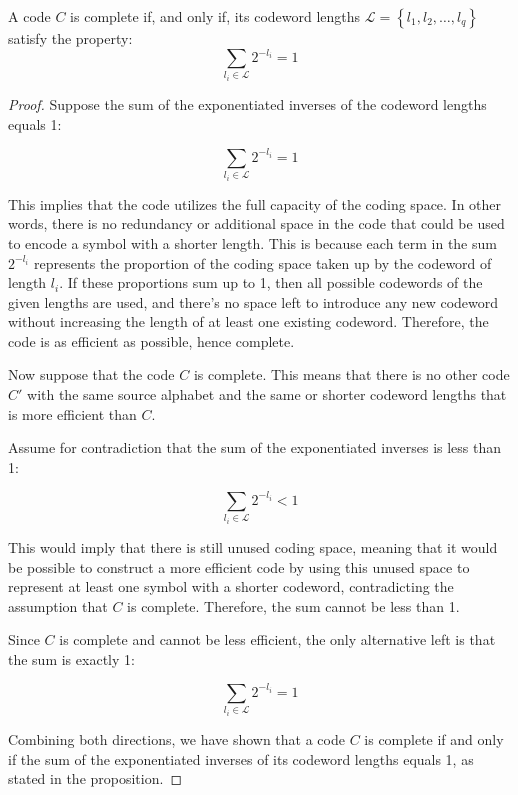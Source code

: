 \begin{proposition}
A code $C$ is complete if, and only if, its codeword lengths $\mathcal{L}=\left\{ l_{1},l_{2},\ldots,l_{q}\right\}$ satisfy the property:
\[
\sum_{l_{i}\in\mathcal{L}}2^{-l_{i}} = 1
\]
\end{proposition}
\begin{proof}
Suppose the sum of the exponentiated inverses of the codeword lengths equals 1:

\[
\sum_{l_{i}\in\mathcal{L}}2^{-l_{i}} = 1
\]

This implies that the code utilizes the full capacity of the coding space. In other words, there is no redundancy or additional space in the code that could be used to encode a symbol with a shorter length. This is because each term in the sum \( 2^{-l_{i}} \) represents the proportion of the coding space taken up by the codeword of length \( l_{i} \). If these proportions sum up to 1, then all possible codewords of the given lengths are used, and there's no space left to introduce any new codeword without increasing the length of at least one existing codeword. Therefore, the code is as efficient as possible, hence complete.

Now suppose that the code \( C \) is complete. This means that there is no other code \( C' \) with the same source alphabet and the same or shorter codeword lengths that is more efficient than \( C \).

Assume for contradiction that the sum of the exponentiated inverses is less than 1:

\[
\sum_{l_{i}\in\mathcal{L}}2^{-l_{i}} < 1
\]

This would imply that there is still unused coding space, meaning that it would be possible to construct a more efficient code by using this unused space to represent at least one symbol with a shorter codeword, contradicting the assumption that \( C \) is complete. Therefore, the sum cannot be less than 1.

Since \( C \) is complete and cannot be less efficient, the only alternative left is that the sum is exactly 1:

\[
\sum_{l_{i}\in\mathcal{L}}2^{-l_{i}} = 1
\]

Combining both directions, we have shown that a code \( C \) is complete if and only if the sum of the exponentiated inverses of its codeword lengths equals 1, as stated in the proposition.

\end{proof}

